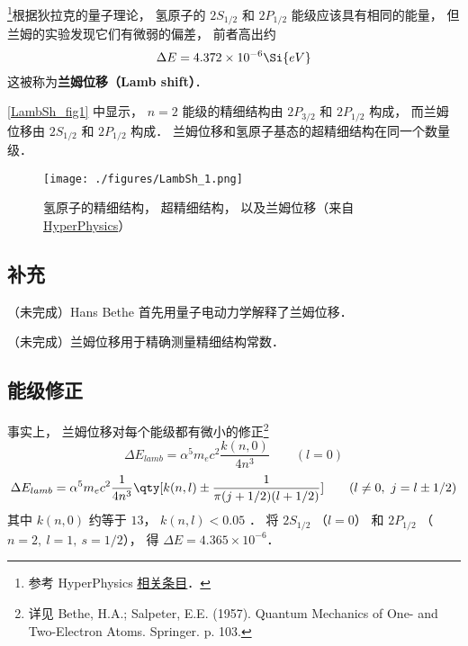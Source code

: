 
\begin{issues}
\issueDraft
\issueMissDepend
\end{issues}


\footnote{参考 HyperPhysics \href{http://hyperphysics.phy-astr.gsu.edu/hbase/quantum/lamb.html}{相关条目}．}根据狄拉克的量子理论， 氢原子的 $2S_{1/2}$ 和 $2P_{1/2}$ 能级应该具有相同的能量， 但兰姆的实验发现它们有微弱的偏差， 前者高出约
\begin{equation}
\Delta E = 4.372\times 10^{-6} \Si{eV}
\end{equation}
这被称为\textbf{兰姆位移（Lamb shift）}．

\autoref{LambSh_fig1} 中显示， $n=2$ 能级的精细结构由 $2P_{3/2}$ 和 $2P_{1/2}$ 构成， 而兰姆位移由 $2S_{1/2}$ 和 $2P_{1/2}$ 构成． 兰姆位移和氢原子基态的超精细结构在同一个数量级． 
\begin{figure}[ht]
\centering
\texttt{[image: ./figures/LambSh\_1.png]}
\caption{氢原子的精细结构， 超精细结构， 以及兰姆位移（来自 \href{http://hyperphysics.phy-astr.gsu.edu/hbase/quantum/lamb.html}{HyperPhysics}）} \label{LambSh_fig1}
\end{figure} %

\subsection{补充}
（未完成）Hans Bethe 首先用量子电动力学解释了兰姆位移．

（未完成）兰姆位移用于精确测量精细结构常数．

\subsection{能级修正}
事实上， 兰姆位移对每个能级都有微小的修正\footnote{详见 Bethe, H.A.; Salpeter, E.E. (1957). Quantum Mechanics of One- and Two-Electron Atoms. Springer. p. 103.}
\begin{equation}
\Delta E_{lamb} = \alpha^5 m_e c^2 \frac{k(n, 0)}{4n^3} \qquad (l = 0)
\end{equation}
\begin{equation}
\Delta E_{lamb} =\alpha^5 m_e c^2 \frac{1}{4n^3} \qty[k(n,l) \pm \frac{1}{\pi(j+1/2)(l+1/2)} ] \qquad (l \ne 0,\ j = l \pm 1/2)
\end{equation}
其中 $k(n, 0)$ 约等于 $13$， $k(n, l) < 0.05$ ． 将 $2S_{1/2}$ （$l = 0$） 和 $2P_{1/2}$ （$n = 2,\ l = 1,\ s = 1/2$）， 得 $\Delta E = 4.365\times 10^{-6}$．
